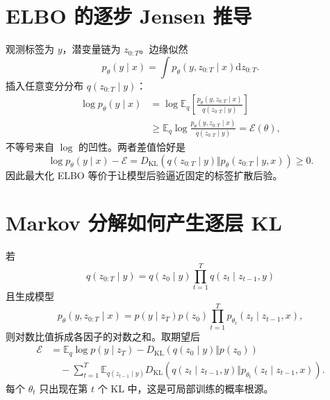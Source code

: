 \documentclass[UTF8,12pt,a4paper,fontset=none]{ctexart}
\numberwithin{equation}{section}
\newcommand{\E}{\mathbb{E}}
\newcommand{\KL}{D_{\mathrm{KL}}}
\newcommand{\dd}{\mathrm{d}}
\begin{document}
\section{ELBO 的逐步 Jensen 推导}
观测标签为 $y$，潜变量链为 $z_{0:T}$。边缘似然
\begin{equation}
 p_\theta(y\mid x)=\int p_\theta(y,z_{0:T}\mid x)\dd z_{0:T}.
\end{equation}
插入任意变分分布 $q(z_{0:T}\mid y)$：
\begin{align}
 \log p_\theta(y\mid x)
 &=\log\E_q\left[
 \frac{p_\theta(y,z_{0:T}\mid x)}{q(z_{0:T}\mid y)}
 \right]\\
 &\ge\E_q\log
 \frac{p_\theta(y,z_{0:T}\mid x)}{q(z_{0:T}\mid y)}
 =\mathcal E(\theta),
\end{align}
不等号来自 $\log$ 的凹性。两者差值恰好是
\begin{equation}
 \log p_\theta(y\mid x)-\mathcal E
 =\KL(q(z_{0:T}\mid y)\Vert p_\theta(z_{0:T}\mid y,x))\ge0.
\end{equation}
因此最大化 ELBO 等价于让模型后验逼近固定的标签扩散后验。

\section{Markov 分解如何产生逐层 KL}
若
\begin{equation}
 q(z_{0:T}\mid y)=q(z_0\mid y)\prod_{t=1}^{T}q(z_t\mid z_{t-1},y)
\end{equation}
且生成模型
\begin{equation}
 p_\theta(y,z_{0:T}\mid x)
 =p(y\mid z_T)p(z_0)\prod_{t=1}^{T}p_{\theta_t}(z_t\mid z_{t-1},x),
\end{equation}
则对数比值拆成各因子的对数之和。取期望后
\begin{align}
 \mathcal E
 &=\E_q\log p(y\mid z_T)
 -\KL(q(z_0\mid y)\Vert p(z_0))\\
 &\quad-\sum_{t=1}^{T}
 \E_{q(z_{t-1}\mid y)}
 \KL(q(z_t\mid z_{t-1},y)
 \Vert p_{\theta_t}(z_t\mid z_{t-1},x)).
\end{align}
每个 $\theta_t$ 只出现在第 $t$ 个 KL 中，这是可局部训练的概率根源。
\end{document}

